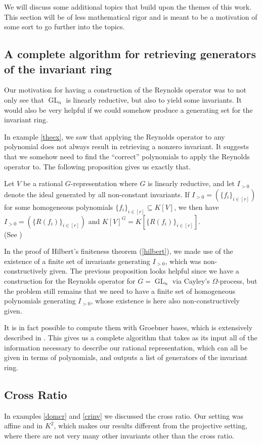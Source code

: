 We will discuss some additional topics that build upon the themes of this work.
This section will be of less mathematical rigor and is meant to be a motivation of some sort to go further into the topics.

\subsection{A complete algorithm for retrieving generators of the invariant ring}
Our motivation for having a construction of the Reynolds operator was to not only see that $\operatorname{GL}_n$ is linearly reductive, but also to yield some invariants.
It would also be very helpful if we could somehow produce a generating set for the invariant ring.

In example \ref{theex}, we saw that applying the Reynolds operator to any polynomial does not always result in retrieving a nonzero invariant.
It suggests that we somehow need to find the ``correct'' polynomials to apply the Reynolds operator to.
The following proposition gives us exactly that.
\begin{proposition}
  Let $V$ be a rational $G$-representation where $G$ is linearly reductive, and let $I_{>0}$ denote the ideal generated by all non-constant invariants.
  If $I_{>0} = \left(\{f_i\}_{i \in[r]}\right)$ for some homogeneous polynomials $\{f_i\}_{i\in[r]} \subseteq K[V]$, we then have $I_{>0} = \left(\{R(f_i)\}_{i\in[r]}\right)$ and $K[V]^G = K\left[\{R(f_i)\}_{i\in[r]}\right]$.  \\
  (See \cite[prop. 4.1.1]{DK15})
\end{proposition}
In the proof of Hilbert's finiteness theorem (\ref{hilbert}), we made use of the existence of a finite set of invariants generating $I_{>0}$, which was non-constructively given.
The previous proposition looks helpful since we have a construction for the Reynolds operator for $G=\operatorname{GL}_n$ via Cayley's $\Omega$-process, but the problem still remains that we need to have a finite set of homogeneous polynomials generating $I_{>0}$, whose existence is here also non-constructively given.

It is in fact possible to compute them with Groebner bases, which is extensively described in \cite[4.1.9]{DK15}.
This gives us a complete algorithm that takes as its input all of the information necessary to describe our rational representation, which can all be given in terms of polynomials, and outputs a list of generators of the invariant ring.

\subsection{Cross Ratio}
In examples \ref{domcr} and \ref{crinv} we discussed the cross ratio.
Our setting was affine and in $K^2$, which makes our results different from the projective setting, where there are not very many other invariants other than the cross ratio.

